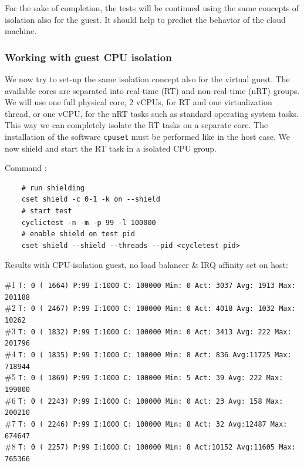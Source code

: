 \documentclass[]{scrartcl}
\begin{document}
For the sake of completion, the tests will be continued using the same concepts of isolation also for the guest. It should help to predict the behavior of the cloud machine.

\subsubsection{Working with guest CPU isolation}

We now try to set-up the same isolation concept also for the virtual guest. The available cores are separated into real-time (RT) and non-real-time (nRT) groups. We will use one full physical core, 2 vCPUs, for RT and one virtualization thread, or one vCPU, for the nRT tasks such as standard operating system tasks. This way we can completely isolate the RT tasks on a separate core. The installation of the software \texttt{cpuset} must be performed like in the host case. We now shield and start the RT task in a isolated CPU group.

\noindent Command : 

\begin{verbatim}
	# run shielding
	cset shield -c 0-1 -k on --shield
	# start test
	cyclictest -n -m -p 99 -l 100000
	# enable shield on test pid
	cset shield --shield --threads --pid <cycletest pid>
\end{verbatim}

\noindent Results with CPU-isolation guest, no load balancer \& IRQ affinity set on host:

\noindent \#1 \small \texttt{T: 0 ( 1664) P:99 I:1000 C: 100000 Min: 0 Act: 3037 Avg: 1913 Max:  201188}\\
\noindent \#2 \small \texttt{T: 0 ( 2467) P:99 I:1000 C: 100000 Min:      0 Act: 4018 Avg: 1032 Max:   10262}\\
\noindent \#3 \small \texttt{T: 0 ( 1832) P:99 I:1000 C: 100000 Min:      0 Act: 3413 Avg:  222 Max:  201796}\\
\noindent \#4 \small \texttt{T: 0 ( 1835) P:99 I:1000 C: 100000 Min:      8 Act:  836 Avg:11725 Max:  718944}\\
\noindent \#5 \small \texttt{T: 0 ( 1869) P:99 I:1000 C: 100000 Min:      5 Act:   39 Avg:  222 Max:  199000}\\
\noindent \#6 \small \texttt{T: 0 ( 2243) P:99 I:1000 C: 100000 Min:      0 Act:   23 Avg:  158 Max:  200210}\\
\noindent \#7 \small \texttt{T: 0 ( 2246) P:99 I:1000 C: 100000 Min:      8 Act:   32 Avg:12487 Max:  674647}\\
\noindent \#8 \small \texttt{T: 0 ( 2257) P:99 I:1000 C: 100000 Min:      8 Act:10152 Avg:11605 Max:  765366}\\
\end{document}
